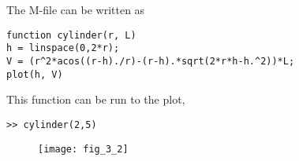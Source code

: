 \documentclass[../main.tex]{subfiles}
\begin{document}
\section{}
The M-file can be written as
\bigbreak
\begin{lstlisting}[numbers=none]
function cylinder(r, L)
h = linspace(0,2*r);
V = (r^2*acos((r-h)./r)-(r-h).*sqrt(2*r*h-h.^2))*L;
plot(h, V)
\end{lstlisting}
\bigbreak
This function can be run to the plot,
\bigbreak
\begin{lstlisting}[numbers=none]
>> cylinder(2,5)
\end{lstlisting}
\bigbreak
\begin{figure}[H]
		\texttt{[image: fig\_3\_2]}
		\label{fig:fig_3_2}
	\end{figure}
\end{document}
